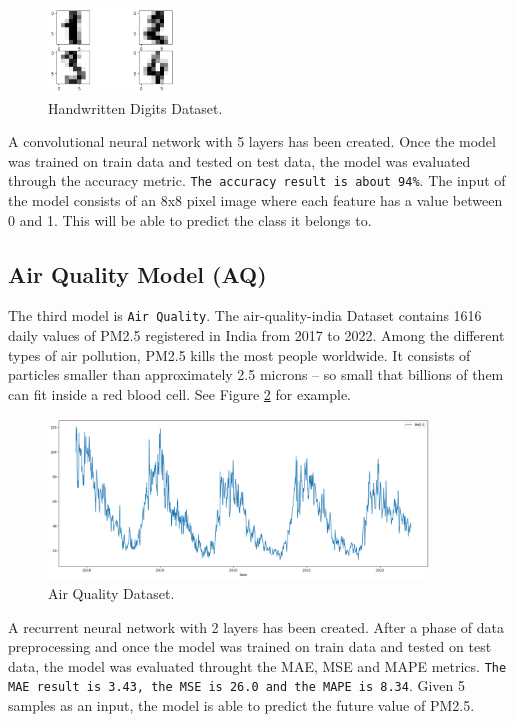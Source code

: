 \documentclass{article}
\begin{document}
\begin{figure}[H]
    \centering
    \includegraphics[width=0.3\textwidth]{HD-Dataset.png}
    \caption{Handwritten Digits Dataset.}
    \label{fig:2}
\end{figure}

A convolutional neural network with 5 layers has been created. Once the model was trained on train data and tested on test data, the model was evaluated through the accuracy metric. \texttt{The accuracy result is about 94\%}. The input of the model consists of an 8x8 pixel image where each feature has a value between 0 and 1. This will be able to predict the class it belongs to.

\subsection{Air Quality Model (AQ)}
The third model is \texttt{Air Quality}. The air-quality-india Dataset contains 1616 daily values of PM2.5 registered in India from 2017 to 2022. Among the different types of air pollution, PM2.5 kills the most people worldwide. It consists of particles smaller than approximately 2.5 microns – so small that billions of them can fit inside a red blood cell. See Figure \ref{fig:3} for example.

\begin{figure}[H]
    \centering
    \includegraphics[width=0.9\textwidth]{AQ-Dataset.png}
    \caption{Air Quality Dataset.}
    \label{fig:3}
\end{figure}

A recurrent neural network with 2 layers has been created. After a phase of data preprocessing and once the model was trained on train data and tested on test data, the model was evaluated throught the MAE, MSE and MAPE metrics. \texttt{The MAE result is 3.43, the MSE is 26.0 and the MAPE is 8.34}. Given 5 samples as an input, the model is able to predict the future value of PM2.5. 
\end{document}
